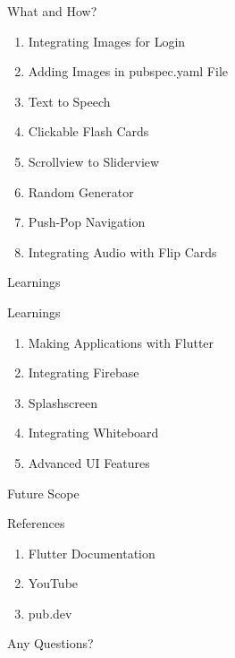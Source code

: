 \documentclass[14pt]{beamer}
\begin{document}
\begin{frame} {What and How?}
    \begin{enumerate}
        \item Integrating Images for Login
    \pause
        \item Adding Images in pubspec.yaml File
    \pause
        \item Text to Speech
    \pause
        \item Clickable Flash Cards
    \pause
        \item Scrollview to Sliderview
    \pause
        \item Random Generator
    \pause
        \item Push-Pop Navigation
    \pause
        \item Integrating Audio with Flip Cards
    \end{enumerate}
\end{frame}


\begin{frame}[standout]
    \alert{Learnings}
\end{frame}

\begin{frame}{Learnings}
    \begin{enumerate}
    \pause
        \item Making Applications with Flutter 
    \pause
        \item Integrating Firebase
    \pause
        \item Splashscreen
    \pause
        \item Integrating Whiteboard
    \pause
        \item Advanced UI Features
    \end{enumerate}
\end{frame}


\begin{frame}[standout]
   Future Scope 
\end{frame}


\begin{frame}{References}
    \begin{enumerate}
        \item Flutter Documentation
        \item YouTube
        \item pub.dev
    \end{enumerate}
\end{frame}


\begin{frame}[standout]
    \alert{Any Questions?}
\end{frame}
\end{document}
